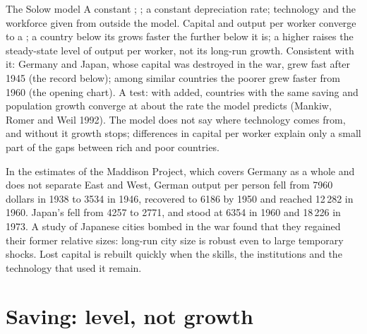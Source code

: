 \begin{model}{The Solow model}
\assumes A constant ; ; a constant depreciation rate; technology and the workforce given from outside the model.
\predicts Capital and output per worker converge to a ; a country below its  grows faster the further below it is; a higher  raises the
  steady-state level of output per worker, not its long-run growth.
\tested Consistent with it: Germany and Japan, whose capital was destroyed in the war, grew fast after 1945 (the record below); among similar countries the
  poorer grew faster from 1960 (the opening chart). A test: with  added, countries with the same saving and population growth converge at about the rate the model predicts (Mankiw, Romer and Weil
  1992).
\breaks The model does not say where technology comes from, and without it growth stops; differences in capital per worker explain only a small part of the gaps between
  rich and poor countries.
\end{model}

\begin{record}
In the estimates of the Maddison Project, which covers Germany as a whole and does not separate East and West, German output per person fell from 7960 dollars in 1938 to 3534 in 1946, recovered to 6186 by 1950 and reached 12\,282 in 1960.
Japan's fell from 4257 to 2771, and stood at 6354 in 1960 and 18\,226 in 1973. A study of Japanese cities bombed in the war found that they regained their former
relative sizes: long-run city size is robust even to large temporary shocks. Lost capital is rebuilt quickly when the skills, the institutions and the technology that
used it remain.
\end{record}

\section{Saving: level, not growth}\label{sec:g12:solow-first-look:saving}

